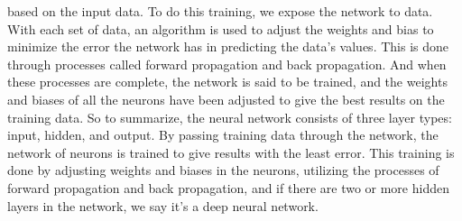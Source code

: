 based on the input data. To do this training, we expose the network to data.
With each set of data, an algorithm is used to adjust the weights and bias to
minimize the error the network has in predicting the data's values.
This is done through processes called forward propagation and back propagation.
And when these processes are complete, the network is said to be trained, and
the weights and biases of all the neurons have been adjusted to give the best
results on the training data. So to summarize, the neural network consists of
three layer types: input, hidden, and output. 
By passing training data through the network, the network of neurons is 
trained to give results with the least error.
This training is done by adjusting weights and biases in the neurons, utilizing
the processes of forward propagation and back propagation, and if there are two
or more hidden layers in the network, we say it's a deep neural network.
